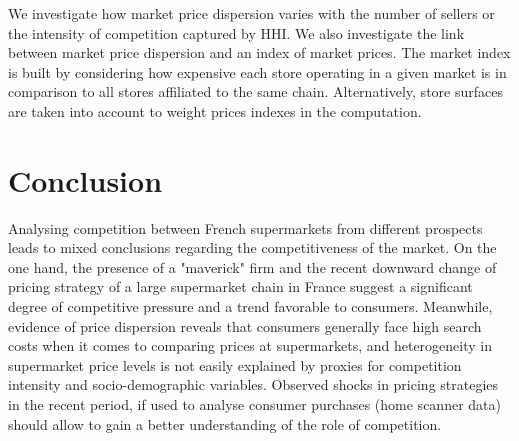 \documentclass[english]{article}
\begin{document}
We investigate how market price dispersion varies with the number of sellers or the intensity of competition captured by HHI. We also investigate the link between market price dispersion and an index of market prices. The market index is built by considering how expensive each store operating in a given market is in comparison to all stores affiliated to the same chain. Alternatively, store surfaces are taken into account to weight prices indexes in the computation.

\section{Conclusion}

Analysing competition between French supermarkets from different prospects leads to mixed conclusions regarding the competitiveness of the market. On the one hand, the presence of a "maverick" firm and the recent downward change of pricing strategy of a large supermarket chain in France suggest a significant degree of competitive pressure and a trend favorable to consumers. Meanwhile, evidence of price dispersion reveals that consumers generally face high search costs when it comes to comparing prices at supermarkets, and heterogeneity in supermarket price levels is not easily explained by proxies for competition intensity and socio-demographic variables. Observed shocks in pricing strategies in the recent period, if used to analyse consumer purchases (home scanner data) should allow to gain a better understanding of the role of competition.

\newpage



\newpage


\end{document}
